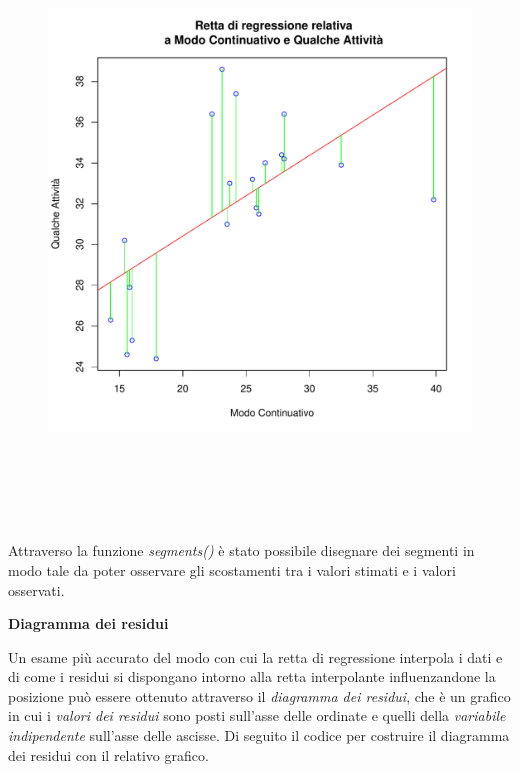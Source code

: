 \vspace{5mm}
\begin{figure}[!htbp]
    \centering
    \includegraphics[height=16cm]{ProgettoSAD/capitoli/images/s_desc_biv/disegno_residui.pdf}
\end{figure}
\vspace{5mm}

Attraverso la funzione \textit{segments()} è stato possibile disegnare dei segmenti in modo tale da poter osservare gli scostamenti tra i valori stimati e i valori osservati.

\vspace{5mm}
\noindent \textbf{Diagramma dei residui}

Un esame più accurato del modo con cui la retta di regressione interpola i dati e di come i residui si dispongano intorno alla retta interpolante influenzandone la posizione può essere ottenuto attraverso il \textit{diagramma dei residui}, che è un grafico in cui i \textit{valori dei residui} sono posti sull'asse delle ordinate e quelli della \textit{variabile indipendente} sull'asse delle ascisse. Di seguito il codice per costruire il diagramma dei residui con il relativo grafico.

